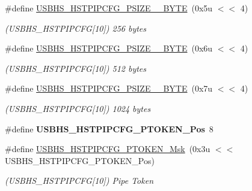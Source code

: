 \begin{DoxyCompactItemize}
\#define \mbox{\hyperlink{group__SAME70__USBHS_ga8609c494ead12f66b21c1efb095173c5}{U\+S\+B\+H\+S\+\_\+\+H\+S\+T\+P\+I\+P\+C\+F\+G\+\_\+\+P\+S\+I\+Z\+E\+\_\+\_\+\+B\+Y\+TE}}~(0x5u $<$$<$ 4)
\begin{DoxyCompactList}\small\item\em (U\+S\+B\+H\+S\+\_\+\+H\+S\+T\+P\+I\+P\+C\+FG\mbox{[}10\mbox{]}) 256 bytes \end{DoxyCompactList}\item 
\mbox{\label{group__SAME70__USBHS_gad28c4edde459d8b58d96f053b7cf402d}} 
\#define \mbox{\hyperlink{group__SAME70__USBHS_gad28c4edde459d8b58d96f053b7cf402d}{U\+S\+B\+H\+S\+\_\+\+H\+S\+T\+P\+I\+P\+C\+F\+G\+\_\+\+P\+S\+I\+Z\+E\+\_\+\_\+\+B\+Y\+TE}}~(0x6u $<$$<$ 4)
\begin{DoxyCompactList}\small\item\em (U\+S\+B\+H\+S\+\_\+\+H\+S\+T\+P\+I\+P\+C\+FG\mbox{[}10\mbox{]}) 512 bytes \end{DoxyCompactList}\item 
\mbox{\label{group__SAME70__USBHS_ga185427a2b04f2207df1e03b7da4728e4}} 
\#define \mbox{\hyperlink{group__SAME70__USBHS_ga185427a2b04f2207df1e03b7da4728e4}{U\+S\+B\+H\+S\+\_\+\+H\+S\+T\+P\+I\+P\+C\+F\+G\+\_\+\+P\+S\+I\+Z\+E\+\_\+\_\+\+B\+Y\+TE}}~(0x7u $<$$<$ 4)
\begin{DoxyCompactList}\small\item\em (U\+S\+B\+H\+S\+\_\+\+H\+S\+T\+P\+I\+P\+C\+FG\mbox{[}10\mbox{]}) 1024 bytes \end{DoxyCompactList}\item 
\mbox{\label{group__SAME70__USBHS_ga2d562fd233ad1cc2f8b5232c21c81b60}} 
\#define {\bfseries U\+S\+B\+H\+S\+\_\+\+H\+S\+T\+P\+I\+P\+C\+F\+G\+\_\+\+P\+T\+O\+K\+E\+N\+\_\+\+Pos}~8
\item 
\mbox{\label{group__SAME70__USBHS_ga9160ad51dac584e665f3ff920817ff34}} 
\#define \mbox{\hyperlink{group__SAME70__USBHS_ga9160ad51dac584e665f3ff920817ff34}{U\+S\+B\+H\+S\+\_\+\+H\+S\+T\+P\+I\+P\+C\+F\+G\+\_\+\+P\+T\+O\+K\+E\+N\+\_\+\+Msk}}~(0x3u $<$$<$ U\+S\+B\+H\+S\+\_\+\+H\+S\+T\+P\+I\+P\+C\+F\+G\+\_\+\+P\+T\+O\+K\+E\+N\+\_\+\+Pos)
\begin{DoxyCompactList}\small\item\em (U\+S\+B\+H\+S\+\_\+\+H\+S\+T\+P\+I\+P\+C\+FG\mbox{[}10\mbox{]}) Pipe Token \end{DoxyCompactList}\item 

\end{DoxyCompactItemize}
